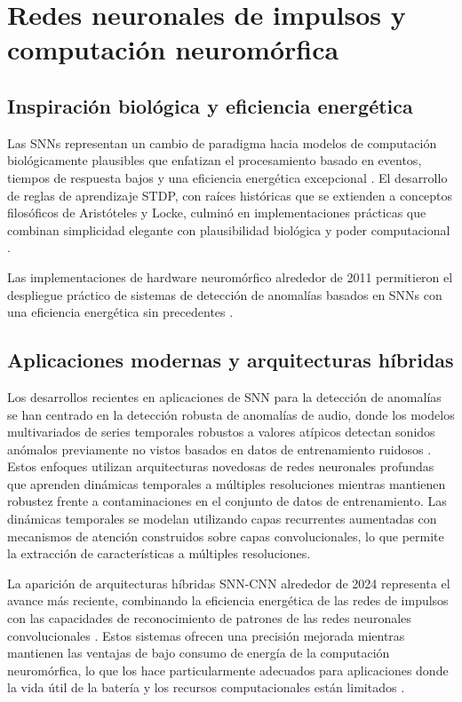 \section{Redes neuronales de impulsos y computación neuromórfica}
\subsection{Inspiración biológica y eficiencia energética}

Las SNNs representan un cambio de paradigma hacia modelos de computación biológicamente plausibles que enfatizan el procesamiento basado en eventos, tiempos de respuesta bajos y una eficiencia energética excepcional \cite{maass_networks_1997}. El desarrollo de reglas de aprendizaje STDP, con raíces históricas que se extienden a conceptos filosóficos de Aristóteles y Locke, culminó en implementaciones prácticas que combinan simplicidad elegante con plausibilidad biológica y poder computacional \cite{markram_history_2011}.

Las implementaciones de hardware neuromórfico alrededor de 2011 permitieron el despliegue práctico de sistemas de detección de anomalías basados en SNNs con una eficiencia energética sin precedentes \cite{indiveri_neuromorphic_2011}.

\subsection{Aplicaciones modernas y arquitecturas híbridas}

Los desarrollos recientes en aplicaciones de SNN para la detección de anomalías se han centrado en la detección robusta de anomalías de audio, donde los modelos multivariados de series temporales robustos a valores atípicos detectan sonidos anómalos previamente no vistos basados en datos de entrenamiento ruidosos \cite{lee_robust_2022}. Estos enfoques utilizan arquitecturas novedosas de redes neuronales profundas que aprenden dinámicas temporales a múltiples resoluciones mientras mantienen robustez frente a contaminaciones en el conjunto de datos de entrenamiento. Las dinámicas temporales se modelan utilizando capas recurrentes aumentadas con mecanismos de atención construidos sobre capas convolucionales, lo que permite la extracción de características a múltiples resoluciones.

La aparición de arquitecturas híbridas SNN-CNN alrededor de 2024 representa el avance más reciente, combinando la eficiencia energética de las redes de impulsos con las capacidades de reconocimiento de patrones de las redes neuronales convolucionales \cite{sanaullah_hybrid_2024}. Estos sistemas ofrecen una precisión mejorada mientras mantienen las ventajas de bajo consumo de energía de la computación neuromórfica, lo que los hace particularmente adecuados para aplicaciones donde la vida útil de la batería y los recursos computacionales están limitados \cite{liu_sparsity-aware_2024}.